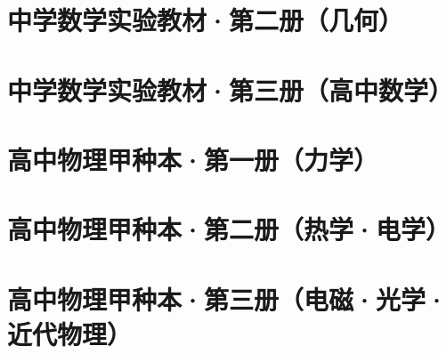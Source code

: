 \chapter{中学数学实验教材·第二册（几何）}


\chapter{中学数学实验教材·第三册（高中数学）}


\chapter{高中物理甲种本·第一册（力学）}


\chapter{高中物理甲种本·第二册（热学·电学）}


\chapter{高中物理甲种本·第三册（电磁·光学·近代物理）}



